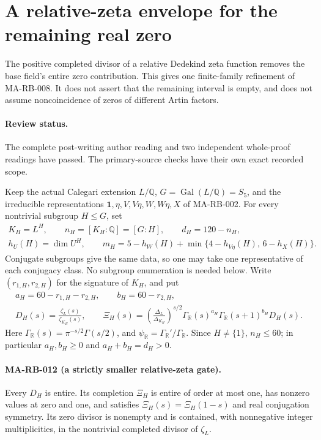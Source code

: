 \section{A relative-zeta envelope for the remaining real zero}
\label{sec:s5-relative-variational}

The positive completed divisor of a relative Dedekind zeta
function removes the base field's entire zero contribution.
This gives one finite-family refinement of MA-RB-008.
It does not assert that the remaining interval is empty,
and does not assume noncoincidence of zeros of different
Artin factors.

\paragraph{Review status.}
The complete post-writing author reading and two independent
whole-proof readings have passed. The primary-source checks
have their own exact recorded scope.

Keep the actual Calegari extension
\(L/\mathbb Q\), \(G=\operatorname{Gal}(L/\mathbb Q)=S_5\),
and the irreducible representations
\(\mathbf1,\eta,V,V\eta,W,W\eta,X\) of MA-RB-002.
For every nontrivial subgroup \(H\le G\), set
\[
 \begin{gathered}
 K_H=L^H,\qquad n_H=[K_H:\mathbb Q]=[G:H],\qquad
 d_H=120-n_H,\\
 h_U(H)=\dim U^H,\qquad
 m_H=5-h_W(H)
        +\min\{4-h_{V\eta}(H),\,6-h_X(H)\}.
 \end{gathered}
 \tag{MA-RB.170}
\]
Conjugate subgroups give the same data, so one may take
one representative of each conjugacy class. No subgroup
enumeration is needed below. Write \((r_{1,H},r_{2,H})\)
for the signature of \(K_H\), and put
\[
 \begin{gathered}
 a_H=60-r_{1,H}-r_{2,H},\qquad b_H=60-r_{2,H},\\
 D_H(s)=\frac{\zeta_L(s)}{\zeta_{K_H}(s)},\qquad
 \Xi_H(s)=
 \left(\frac{\Delta_L}{\Delta_{K_H}}\right)^{s/2}
       \Gamma_{\mathbb R}(s)^{a_H}
       \Gamma_{\mathbb R}(s+1)^{b_H}D_H(s).
 \end{gathered}
 \tag{MA-RB.171}
\]
Here \(\Gamma_{\mathbb R}(s)=\pi^{-s/2}\Gamma(s/2)\),
and \(\psi_{\mathbb R}=\Gamma_{\mathbb R}'/
\Gamma_{\mathbb R}\). Since \(H\ne\{1\}\),
\(n_H\le60\); in particular \(a_H,b_H\ge0\)
and \(a_H+b_H=d_H>0\).

\paragraph{MA-RB-012 (a strictly smaller relative-zeta gate).}
Every \(D_H\) is entire. Its completion \(\Xi_H\)
is entire of order at most one, has nonzero values at
zero and one, and satisfies
\(\Xi_H(s)=\Xi_H(1-s)\) and real conjugation symmetry.
Its zero divisor is nonempty and is contained, with
nonnegative integer multiplicities, in the nontrivial
completed divisor of \(\zeta_L\).

